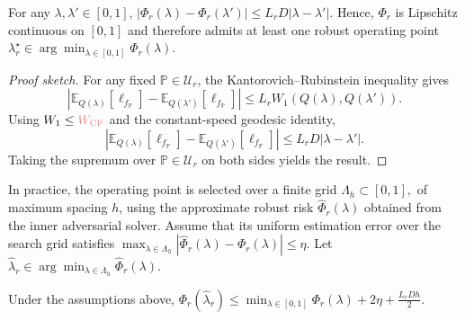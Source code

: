 
\begin{proposition}
For any $\lambda,\lambda'\in[0,1]$,
\(
\left|
\Phi_r(\lambda)
-
\Phi_r(\lambda')
\right|
\le
L_r D
|\lambda-\lambda'|.
\)
Hence, $\Phi_r$ is Lipschitz continuous on $[0,1]$ and therefore admits
at least one robust operating point
$
\lambda_r^\star
\in
\arg\min_{\lambda\in[0,1]}
\Phi_r(\lambda).
$
\end{proposition}

\begin{proof}[Proof sketch]
For any fixed $\mathbb{P}\in\mathcal U_r$, the Kantorovich--Rubinstein
inequality gives
\[
\left|
\mathbb E_{Q(\lambda)}
[\ell_{f_\mathbb{P}}]
-
\mathbb E_{Q(\lambda')}
[\ell_{f_\mathbb{P}}]
\right|
\le
L_r
W_1
\left(
Q(\lambda),Q(\lambda')
\right).
\]
Using $W_1\le \textcolor{frappe_red}{W_{\mathrm{CF}}}$ and the constant-speed geodesic identity,
\[
\left|
\mathbb E_{Q(\lambda)}
[\ell_{f_\mathbb{P}}]
-
\mathbb E_{Q(\lambda')}
[\ell_{f_\mathbb{P}}]
\right|
\le
L_rD|\lambda-\lambda'|.
\]
Taking the supremum over $\mathbb{P}\in\mathcal U_r$ on both sides yields the
result.
\end{proof}

In practice, the operating point is selected over a finite grid
$
\Lambda_h
\subset[0,1],
$
of maximum spacing $h$, using
the approximate robust risk $
\widehat\Phi_r(\lambda)
$
obtained from the inner adversarial
solver. Assume that its uniform estimation
error over the search grid satisfies
$
\max_{\lambda\in\Lambda_h}
\left|
\widehat\Phi_r(\lambda)
-
\Phi_r(\lambda)
\right|
\le
\eta.
$
Let
$
\widehat\lambda_r
\in
\arg\min_{\lambda\in\Lambda_h}
\widehat\Phi_r(\lambda).
$

\begin{proposition}
Under the assumptions above,
$
\Phi_r(\widehat\lambda_r)
\le
\min_{\lambda\in[0,1]}
\Phi_r(\lambda)
+
2\eta
+
\frac{L_rDh}{2}.
$
\end{proposition}

